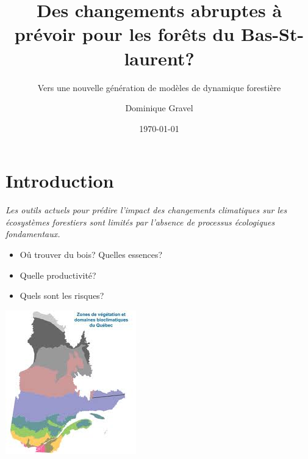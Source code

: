 \documentclass{eecslides}
\title[Forêts-CC]{Des changements abruptes à prévoir pour les forêts du Bas-St-laurent?}
\subtitle{Vers une nouvelle génération de modèles de dynamique forestière}
\author[D. Gravel]{Dominique Gravel}
\institute[Chaire de recherche EEC]{UQAR -- Chaire de Recherche EEC}
\date{\today}
\begin{document}

	\begin{frame}[plain]
		\titlepage
	\end{frame}
	
	\section{Introduction}

	\begin{frame}

		\textit{Les outils actuels pour prédire l'impact des changements climatiques sur les écosystèmes forestiers sont limités par l'absence de processus écologiques fondamentaux.}

	\end{frame}


	\begin{frame}
		\begin{center}
				\begin{itemize}
					\item Oû trouver du bois? Quelles essences?
					\item Quelle productivité?
					\item Quels sont les risques?			
				\end{itemize}
		\end{center}

	\end{frame}


	\begin{frame}
		\begin{center}
			\includegraphics[height=0.75\textheight]{bioclim_MRN}
		\end{center}
	\end{frame}
\end{document}
